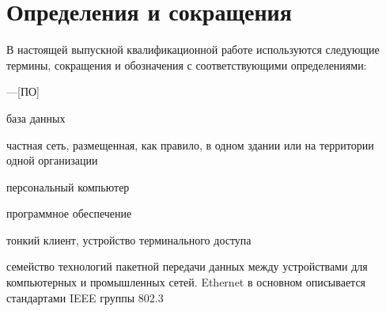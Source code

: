 \chapter*{Определения и сокращения}

В настоящей выпускной квалификационной работе используются следующие термины, сокращения
и обозначения с соответствующими определениями:


\noindent
	\begin{desclist}{}{ \rm\hfill —}[ПО]
		\item[БД] база данных
		\item[Локальная вычислительная сеть (ЛВС)] частная сеть, размещенная, как
	правило, в одном здании или на территории одной организации
		\item[ПК] персональный компьютер
		\item[ПО] программное обеспечение
		\item[ТК] тонкий клиент, устройство терминального доступа
		\item[Ethernet] семейство технологий пакетной передачи данных между
	устройствами для компьютерных и промышленных сетей. Ethernet в основном
	описывается стандартами IEEE группы 802.3
	\end{desclist}
